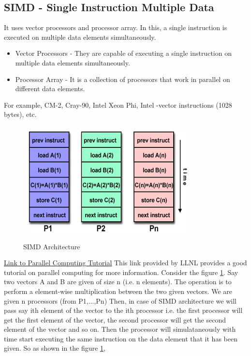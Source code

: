 \documentclass[12pt]{article}
\begin{document}
\subsection{SIMD - Single Instruction Multiple Data}
It uses vector processors and processor array. In this, a single instruction is executed on multiple data elements simultaneously. 
\begin{itemize}
    \item Vector Processors - They are capable of executing a single instruction on multiple data elements simultaneously.
    \item Processor Array - It is a collection of processors that work in parallel on different data elements.
\end{itemize}
For example, CM-2, Cray-90, Intel Xeon Phi, Intel -vector instructions (1028 bytes), etc.
\begin{figure}[H]
    \centering
    \includegraphics[width=0.8\textwidth]{images/simd.png}
    \caption{SIMD Architecture}
    \label{fig:simd}
\end{figure}
\href{http://www.llnl.gov/computing/tutorials/parallel_comp/}{Link to Parallel Computing Tutorial}
This link provided by LLNL provides a good tutorial on parallel computing for more information. 
Consider the figure \ref{fig:simd}. Say two vectors A and B are given of size n (i.e. n elements). The operation is to perform 
a element-wise multiplication between the two given vectors. We are given n processors (from P1,...,Pn) Then, in case of SIMD architecture we will pass 
say ith element of the vector to the ith processor i.e. the first processor will get the first element of the vector,
the second processor will get the second element of the vector and so on. Then the processor will simulataneously with time
start executing the same instruction on the data element that it has been given. So as shown in the figure \ref{fig:simd}, 
\end{document}
